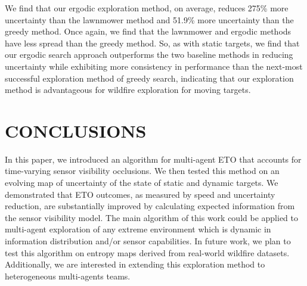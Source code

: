\documentclass[letterpaper, 10 pt, conference]{ieeeconf}  %
\begin{document}
We find that our ergodic exploration method, on average, reduces 275\% more uncertainty than the lawnmower method and 51.9\% more uncertainty than the greedy method. Once again, we find that the lawnmower and ergodic methods have less spread than the greedy method. So, as with static targets, we find that our ergodic search approach outperforms the two baseline methods in reducing uncertainty while exhibiting more consistency in performance than the next-most successful exploration method of greedy search, indicating that our exploration method is advantageous for wildfire exploration for moving targets.

\section{CONCLUSIONS}
In this paper, we introduced an algorithm for multi-agent ETO that accounts for time-varying sensor visibility occlusions. We then tested this method on an evolving map of uncertainty of the state of static and dynamic targets. We demonstrated that ETO outcomes, as measured by speed and uncertainty reduction, are substantially improved by calculating expected information from the sensor visibility model. The main algorithm of this work could be applied to multi-agent exploration of any extreme environment which is dynamic in information distribution and/or sensor capabilities. In future work, we plan to test this algorithm on entropy maps derived from real-world wildfire datasets. Additionally, we are interested in extending this exploration method to heterogeneous multi-agents teams. 



\end{document}
